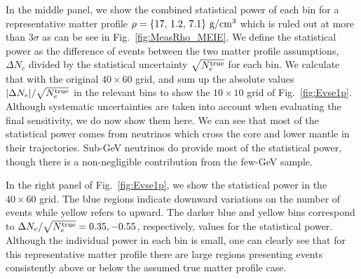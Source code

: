 In the middle panel, we show the combined statistical power of each bin for a representative matter profile $\rho=\{17,\,1.2,\,7.1\}~{\rm g/cm^{3}}$ which is ruled out at more than 3$\sigma$ as can be see in Fig.~\ref{fig:MeasRho_MEIE}.
We define the statistical power as the difference of events between the two matter profile assumptions, $\Delta N_e$ divided by the statistical uncertainty $\sqrt{N_e^{\rm true}}$ for each bin.
We calculate that with the original $40\times60$ grid, and sum up the absolute values  $|\Delta N_e|/\sqrt{N_e^{\rm true}}$ in the relevant bins to show the $10\times10$ grid of Fig.~\ref{fig:Evse1p}.
Although systematic uncertainties are taken into account when evaluating the final sensitivity, we do now show them here.
We can see that most of the statistical power comes from neutrinos which cross the core and lower mantle in their trajectories.
Sub-GeV neutrinos do provide most of the statistical power, though there is a non-negligible contribution from the few-GeV sample.

In the right panel of Fig.~\ref{fig:Evse1p}, we show the statistical power in the $40\times60$ grid.
The blue regions indicate downward variations on the number of events while yellow refers to upward.
The darker blue and yellow bins correspond to $\Delta N_e/\sqrt{N_e^{\rm true}}= 0.35, -0.55$, respectively, values for the statistical power.
Although the individual power in each bin is small, one can clearly see that for this representative matter profile there are large regions presenting events consistently above or below the assumed true matter profile case.

